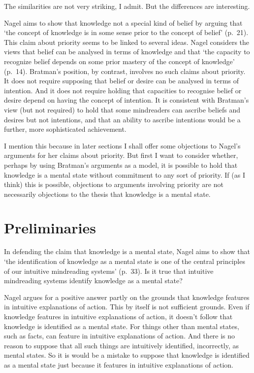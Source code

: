 \documentclass[11pt,a4paper]{extarticle}
\begin{document}
The similarities are not very striking, I admit.
But the differences are interesting.

Nagel aims to show that knowledge not a special kind of belief by arguing that `the concept of knowledge is in some sense prior to the concept of belief' (p.\ 21).
This claim about priority seems to be linked to several ideas.
Nagel considers the views that belief can be analysed in terms of knowledge and that `the capacity to recognize belief depends on some prior mastery of the concept of knowledge' (p.\ 14).
Bratman's position, 
by contrast, 
involves no such claims about priority.
It does not require supposing that belief or desire can be analysed in terms of intention.
And it does not require holding that capacities to recognise belief or desire depend on having the concept of intention.
It is consistent with Bratman's view 
(but not required) 
to hold that 
some mindreaders can ascribe beliefs and desires but not intentions,
and that 
an ability to ascribe intentions would be a further, more sophisticated achievement.

I mention this because in later sections I shall offer some objections to Nagel's arguments for her claims about priority.
But first I want to
consider whether, perhaps by using Bratman's arguments as a model,
it is possible to  hold that
 knowledge is a mental state 
without
commitment to any sort of priority.
If (as I think) this is possible, 
objections to arguments involving priority 
are not necessarily
objections to the thesis that knowledge is a mental state.





\section{Preliminaries}
In defending the claim that knowledge is a mental state, Nagel aims to show that `the identification of knowledge as a mental state is one of the central principles of our intuitive mindreading systems' (p.\ 33).
Is it true that intuitive mindreading systems identify knowledge as a mental state?





Nagel argues for a positive answer
partly on the grounds that 
knowledge features in intuitive explanations of action.
This by itself is not sufficient grounds.
Even if knowledge features in intuitive explanations of action, 
it doesn't follow that
knowledge is identified as a mental state.
For things other than mental states, such as facts, can feature in intuitive explanations of action.
And there is no reason to suppose that all such things are intuitively identified, incorrectly, as mental states.
So it is would be a mistake to suppose that knowledge is identified as a mental state just because it features in intuitive explanations of action.
\end{document}
